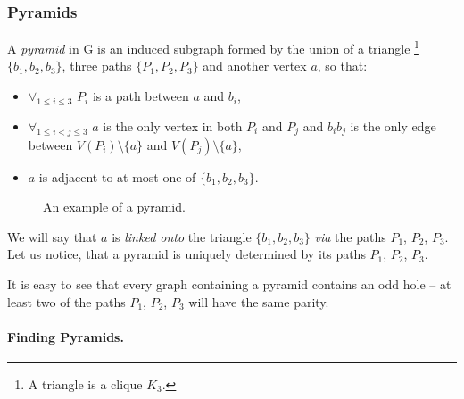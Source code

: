 \subsubsection{Pyramids}


A \emph{pyramid} in G is an induced subgraph formed by the union of a triangle \footnote{A triangle is a clique $K_3$.} $\{b_1,b_2,b_3\}$, three paths $\{P_1, P_2, P_3\}$ and another vertex $a$, so that:

\begin{minipage}{0.60\textwidth}
\begin{itemize}
	\item $\forall_{1\leq i \leq 3}$ $P_i$ is a path between $a$ and $b_i$,
	\item $\forall_{1\leq i < j \leq 3}$ $a$ is the only vertex in both $P_i$ and $P_j$ and $b_ib_j$ is the only edge between $V(P_i)\setminus\{a\}$ and $V(P_j)\setminus\{a\}$,
	\item $a$ is adjacent to at most one of $\{b_1, b_2, b_3\}$.
\end{itemize}
\end{minipage}%
\begin{wrapfigure}{r}{0.32\textwidth}
	\vspace{-2.5cm}
	
	\caption{An example  of a pyramid.}%
	\vspace{-1.2cm}
\end{wrapfigure}

We will say that $a$ is \emph{linked onto} the triangle $\{b_1, b_2, b_3\}$ \emph{via} the paths $P_1$, $P_2$, $P_3$. Let us notice, that a pyramid is uniquely determined by its paths $P_1$, $P_2$, $P_3$.

It is easy to see that every graph containing a pyramid contains an odd hole -- at least two of the paths $P_1$, $P_2$, $P_3$ will have the same parity.

\paragraph{Finding Pyramids.}

